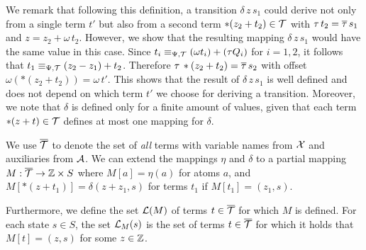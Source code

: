 We remark that following this definition, a transition $\delta\,z\,s_1$ could derive not only from a single term $t'$ but also from a second term $*(z_2 + t_2) \in \mathcal{T}$ with $\tau\,t_2=\overline{\tau}\,s_1$ and $z = z_2 + \omega\,t_2$.
However, we show that the resulting mapping $\delta\,z\,s_1$  would have the same value in this case.
Since $t_i \equiv_{\Psi,\mathcal{T}} (\omega t_i) + (\tau Q_i)$ for $i = 1,2$, it follows that $t_1 \equiv_{\Psi,\mathcal{T}} (z_2 - z_1)+ t_2$.
Therefore $\tau\,*(z_2+t_2)=\overline{\tau}\,s_2$ with offset $\omega(*(z_2+t_2)) = \omega\,t'$.
This shows that the result of $\delta\,z\,s_1$ is well defined and does not depend on which term $t'$ we choose for deriving a transition.
Moreover, we note that $\delta$ is defined only for a finite amount of values, given that each term $*(z + t) \in \mathcal{T}$ defines at most one mapping for $\delta$.

We use ${\overline{\mathcal{T}}}$ to denote the set of \emph{all} terms with variable names from $\mathcal{X}$ and auxiliaries from $\mathcal{A}$.
We can extend the mappings $\eta$ and $\delta$ to a partial mapping $M : {\overline{\mathcal{T}}} \rightarrow \mathbb{Z} \times S$ where $M[a] = \eta(a)$ for atoms $a$, and $M[*(z+t_1)] = \delta(z+z_1, s)$ for terms $t_1$ if $M[t_1] = (z_1,s)$.

Furthermore, we define the set $\mathcal{L}(M)$ of terms $t \in {\overline{\mathcal{T}}}$ for which $M$ is defined.
For each state $s \in S$, the set $\mathcal{L}_{M}(s)$ is the set of terms $t \in {\overline{\mathcal{T}}}$ for which it holds that $M[t] = (z, s)$ for some $z \in \mathbb{Z}$.

